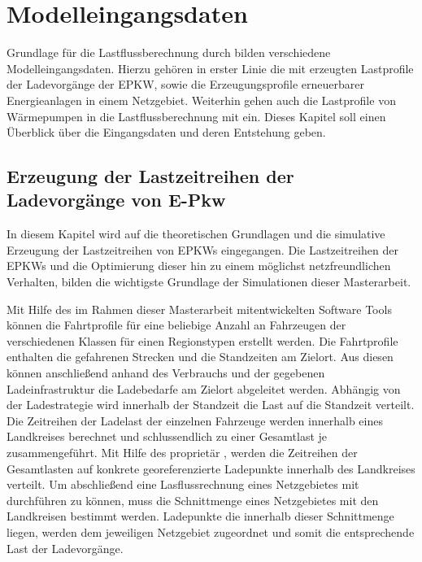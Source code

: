 
\section{Modelleingangsdaten}

Grundlage für die Lastflussberechnung durch \edisgo bilden verschiedene Modelleingangsdaten.
Hierzu gehören in erster Linie die mit \simbev erzeugten Lastprofile der Ladevorgänge der \gls{EPKW}, sowie die Erzeugungsprofile erneuerbarer Energieanlagen in einem Netzgebiet.
Weiterhin gehen auch die Lastprofile von Wärmepumpen in die Lastflussberechnung mit ein. Dieses Kapitel soll einen Überblick über die Eingangsdaten und deren Entstehung geben.

\subsection{Erzeugung der Lastzeitreihen der Ladevorgänge von E-Pkw}

In diesem Kapitel wird auf die theoretischen Grundlagen und die simulative Erzeugung der Lastzeitreihen von \glspl{EPKW} eingegangen.
Die Lastzeitreihen der \glspl{EPKW} und die Optimierung dieser hin zu einem möglichst netzfreundlichen Verhalten, bilden die wichtigste Grundlage der Simulationen dieser Masterarbeit.\medskip

Mit Hilfe des im Rahmen dieser Masterarbeit mitentwickelten Software Tools \simbev können die Fahrtprofile für eine beliebige Anzahl an Fahrzeugen der verschiedenen Klassen für einen Regionstypen erstellt werden.
Die Fahrtprofile enthalten die gefahrenen Strecken und die Standzeiten am Zielort.
Aus diesen können anschließend anhand des Verbrauchs und der gegebenen Ladeinfrastruktur die Ladebedarfe am Zielort abgeleitet werden.
Abhängig von der Ladestrategie wird innerhalb der Standzeit die Last auf die Standzeit verteilt.
Die Zeitreihen der Ladelast der einzelnen Fahrzeuge werden innerhalb eines Landkreises berechnet und schlussendlich zu einer Gesamtlast je \UC zusammengeführt.
Mit Hilfe des proprietär \localiserToolsKomma , werden die Zeitreihen der Gesamtlasten auf konkrete georeferenzierte Ladepunkte innerhalb des Landkreises verteilt.
Um abschließend eine Lasflussrechnung eines Netzgebietes mit \edisgo durchführen zu können, muss die Schnittmenge eines Netzgebietes mit den Landkreisen bestimmt werden.
Ladepunkte die innerhalb dieser Schnittmenge liegen, werden dem jeweiligen Netzgebiet zugeordnet und somit die entsprechende Last der Ladevorgänge.

